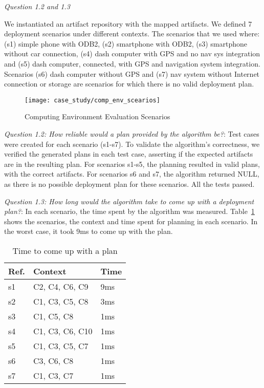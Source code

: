 \emph{Question 1.2 and 1.3}

We instantiated an artifact repository with the mapped artifacts. We defined 7 deployment scenarios under different contexts. The scenarios that we used where: (s1) simple phone with ODB2, (s2) smartphone with ODB2, (s3) smartphone without car connection, (s4) dash computer with GPS and no nav sys integration and (s5) dash computer, connected, with GPS and navigation system integration. Scenarios (s6) dash computer without GPS and (s7) nav system without Internet connection or storage are scenarios for which there is no valid deployment plan.

\begin{figure}[!htb]
 \centering
 \texttt{[image: case\_study/comp\_env\_scearios]}
 \caption{Computing Environment Evaluation Scenarios}
\label{fig:variability_scenarios}
\end{figure}


\emph{Question 1.2:  How reliable would a plan provided
by the algorithm be?}: Test cases were created for each scenario (s1-s7).
To validate the algorithm’s correctness,
we verified the generated plans in each test case, asserting if the expected artifacts are in the resulting plan.
For scenarios s1-s5, the planning resulted in valid plans, with the correct artifacts. For scenarios s6 and s7, the algorithm returned NULL, as there is no possible deployment plan for these scenarios. All the tests passed.

\emph{Question 1.3: How long would the algorithm take to come up with a deployment plan?}: In each scenario, the time spent by the algorithm was measured. Table~\ref{table:planning_time} shows the scenarios, the context and time spent for planning in each scenario. In the worst case, it took 9ms to come up with the plan.

\begin{table}[!htb]
\centering
\caption{Time to come up with a plan}
\begin{tabular}{|p{0.7cm}|p{3.75cm}|p{1cm}|}
\hline
  Ref. &
  Context &
  Time \\ \hline

s1 &
C2, C4, C6, C9 &
9ms \\ \hline
s2 &
C1, C3, C5, C8 &
3ms \\ \hline
s3 &
C1, C5, C8 &
1ms \\ \hline
s4 &
C1, C3, C6, C10 &
1ms \\ \hline
s5 &
C1, C3, C5, C7 &
1ms \\ \hline
s6 &
C3, C6, C8 &
1ms \\ \hline
s7 &
C1, C3, C7  &
1ms \\ \hline

\end{tabular}
\label{table:planning_time}
\end{table}

